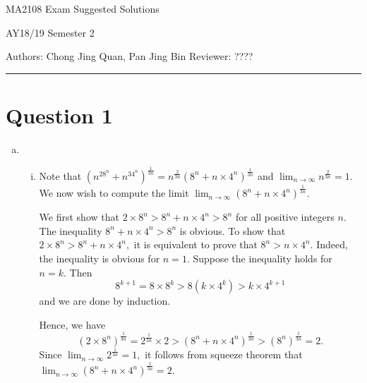 \documentclass{article}
\begin{document}
    {\LARGE{MA2108 Exam Suggested Solutions}}
    
    {\large{AY18/19 Semester 2}}
    \vspace{0.2in}
    
    Authors: Chong Jing Quan, Pan Jing Bin \hfill Reviewer: ????
    
    \par\noindent\rule{\textwidth}{0.4pt}
\section*{Question 1}
\begin{enumerate}[(a)]
    \item \begin{enumerate}[(i)]
        \item Note that $\displaystyle(n^28^n+n^34^n)^{\frac{1}{3n}}=n^{\frac{2}{3n}}(8^n+n\times4^n)^{\frac{1}{3n}}$ and $\displaystyle\lim_{n\to\infty}n^{\frac{2}{3n}}=1.$ We now wish to compute the limit $\displaystyle\lim_{n\to\infty}(8^n+n\times4^n)^{\frac{1}{3n}}.$
        
        We first show that $2\times8^n>8^n+n\times4^n>8^n$ for all positive integers $n.$ The inequality $8^n+n\times 4^n>8^n$ is obvious. To show that $2\times8^n>8^n+n\times4^n,$ it is equivalent to prove that $8^n>n\times4^n.$ Indeed, the inequality is obvious for $n=1.$ Suppose the inequality holds for $n=k.$ Then $$8^{k+1}=8\times8^k>8(k\times 4^k)>k\times 4^{k+1}$$ and we are done by induction.
        
        Hence, we have $$(2\times8^n)^{\frac{1}{3n}}=2^{\frac{1}{3n}}\times2>(8^n+n\times4^n)^{\frac{1}{3n}}>(8^n)^{\frac{1}{3n}}=2.$$
        Since $\displaystyle\lim_{n\to\infty}2^{\frac{1}{3n}}=1,$ it follows from squeeze theorem that $\displaystyle\lim_{n\to\infty}(8^n+n\times4^n)^{\frac{1}{3n}}=2.$
        

\end{enumerate}
\end{enumerate}
\end{document}
